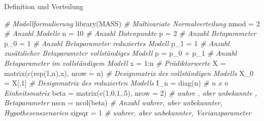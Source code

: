 \documentclass[
  8pt,
  ignorenonframetext,
]{beamer}
\newenvironment{Shaded}{\begin{snugshade}}{\end{snugshade}}
\newcommand{\AttributeTok}[1]{\textcolor[rgb]{0.77,0.63,0.00}{#1}}
\newcommand{\CommentTok}[1]{\textcolor[rgb]{0.56,0.35,0.01}{\textit{#1}}}
\newcommand{\DecValTok}[1]{\textcolor[rgb]{0.00,0.00,0.81}{#1}}
\newcommand{\FunctionTok}[1]{\textcolor[rgb]{0.00,0.00,0.00}{#1}}
\newcommand{\NormalTok}[1]{#1}
\newcommand{\OtherTok}[1]{\textcolor[rgb]{0.56,0.35,0.01}{#1}}
\newcommand{\SpecialCharTok}[1]{\textcolor[rgb]{0.00,0.00,0.00}{#1}}
\begin{document}
\begin{frame}[fragile]{Definition und Verteilung}
\begin{Shaded}
\begin{Highlighting}[]
\CommentTok{\# Modellformulierung}
\FunctionTok{library}\NormalTok{(MASS)                                             }\CommentTok{\# Multivariate Normalverteilung}
\NormalTok{nmod   }\OtherTok{=} \DecValTok{2}                                                \CommentTok{\# Anzahl Modelle}
\NormalTok{n      }\OtherTok{=} \DecValTok{10}                                               \CommentTok{\# Anzahl Datenpunkte}
\NormalTok{p      }\OtherTok{=} \DecValTok{2}                                                \CommentTok{\# Anzahl Betaparameter}
\NormalTok{p\_0    }\OtherTok{=} \DecValTok{1}                                                \CommentTok{\# Anzahl Betaparameter reduziertes Modell}
\NormalTok{p\_1    }\OtherTok{=} \DecValTok{1}                                                \CommentTok{\# Anzahl zusätzlicher Betaparameter vollständiges Modell}
\NormalTok{p      }\OtherTok{=}\NormalTok{ p\_0 }\SpecialCharTok{+}\NormalTok{ p\_1                                        }\CommentTok{\# Anzahl Betaparameter im vollständigem Modell}
\NormalTok{x      }\OtherTok{=} \DecValTok{1}\SpecialCharTok{:}\NormalTok{n                                              }\CommentTok{\# Prädiktorwerte}
\NormalTok{X      }\OtherTok{=} \FunctionTok{matrix}\NormalTok{(}\FunctionTok{c}\NormalTok{(}\FunctionTok{rep}\NormalTok{(}\DecValTok{1}\NormalTok{,n),x), }\AttributeTok{nrow =}\NormalTok{ n)                  }\CommentTok{\# Designmatrix des vollständigen Modells}
\NormalTok{X\_0    }\OtherTok{=}\NormalTok{ X[,}\DecValTok{1}\NormalTok{]                                            }\CommentTok{\# Designmatrix des reduzierten Modells}
\NormalTok{I\_n    }\OtherTok{=} \FunctionTok{diag}\NormalTok{(n)                                          }\CommentTok{\# n x n Einheitsmatrix}
\NormalTok{beta   }\OtherTok{=} \FunctionTok{matrix}\NormalTok{(}\FunctionTok{c}\NormalTok{(}\DecValTok{1}\NormalTok{,}\DecValTok{0}\NormalTok{,}\DecValTok{1}\NormalTok{,.}\DecValTok{5}\NormalTok{), }\AttributeTok{nrow =} \DecValTok{2}\NormalTok{)                    }\CommentTok{\# wahre , aber unbekannte , Betaparameter}
\NormalTok{nscn   }\OtherTok{=} \FunctionTok{ncol}\NormalTok{(beta)                                       }\CommentTok{\# Anzahl wahrer, aber unbekannter, Hypothesenszenarien}
\NormalTok{sigsqr }\OtherTok{=} \DecValTok{1}                                                \CommentTok{\# wahrer, aber unbekannter, Varianzparameter}


\end{Highlighting}
\end{Shaded}
\end{frame}
\end{document}
